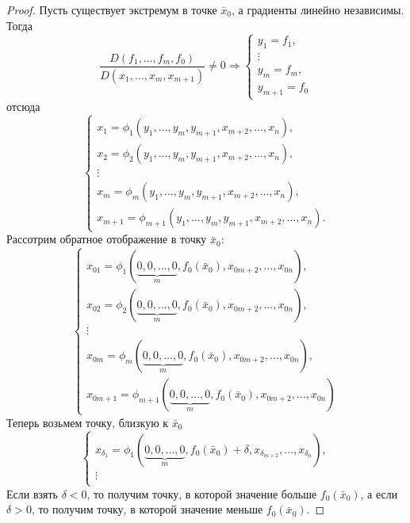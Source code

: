 \begin{proof}
    Пусть существует экстремум в точке $\bar{x}_0$, а градиенты линейно независимы. Тогда
    \[\frac{D(f_1,\dots,f_m,f_0)}{D(x_1,\dots,x_m,x_{m+1})}\ne 0 \Rightarrow
    \begin{cases}
        y_1=f_1,\\
        \vdots\\
        y_m=f_m,\\
        y_{m+1}=f_0
    \end{cases}    
    \]
    отсюда
    \[\begin{cases}
        x_1=\phi_1(y_1,\dots,y_m,y_{m+1},x_{m+2},\dots,x_n),\\
        x_2=\phi_2(y_1,\dots,y_m,y_{m+1},x_{m+2},\dots,x_n),\\
        \vdots\\
        x_m=\phi_m(y_1,\dots,y_m,y_{m+1},x_{m+2},\dots,x_n),\\
        x_{m+1}=\phi_{m+1}(y_1,\dots,y_m,y_{m+1},x_{m+2},\dots,x_n).
    \end{cases}\]
    Рассотрим обратное отображение в точку $\bar{x}_0$:
    \[\begin{cases}
        x_{01}=\phi_1(\underbrace{0,0,\dots,0}_m,f_0(\bar{x}_0), x_{0m+2}, \dots, x_{0n}),\\ %
        x_{02}=\phi_2(\underbrace{0,0,\dots,0}_m,f_0(\bar{x}_0), x_{0m+2}, \dots, x_{0n}),\\
        \vdots\\
        x_{0m}=\phi_{m}(\underbrace{0,0,\dots,0}_m,f_0(\bar{x}_0), x_{0m+2}, \dots, x_{0n}),\\
        x_{0m+1}=\phi_{m+1}(\underbrace{0,0,\dots,0}_m,f_0(\bar{x}_0), x_{0m+2}, \dots, x_{0n})
    \end{cases}
    \]
    Теперь возьмем точку, близкую к $\bar{x}_0$
    \[
    \begin{cases}
        x_{\delta_1}=\phi_1(\underbrace{0,0,\dots,0}_m,f_0(\bar{x}_0)+\delta,x_{\delta_{m+2}},\dots,x_{\delta_n}),\\
        \vdots\\

    \end{cases}
    \]
    Если взять $\delta<0$, то получим точку, в которой значение больше $f_0(\bar{x}_0)$, а если $\delta>0$, то получим точку, в которой значение меньше $f_0(\bar{x}_0)$.
\end{proof} 
